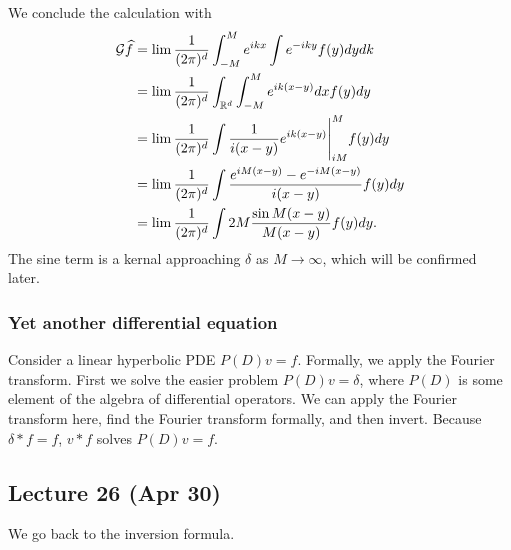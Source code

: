 \documentclass[10pt, twoside]{article}
\begin{document}
    We conclude the calculation with 
    \begin{align*}
        \mathcal{G} \widehat{f} &= \lim \frac{1}{(2\pi)^d} \int_{-M}^M e^{ikx} \int e^{-iky} f(y) dy dk \\
                           &= \lim \frac{1}{(2\pi)^d} \int_{\mathbb{R}^d} \int_{-M}^M e^{ik(x-y)} dx f(y) dy \\
                           &= \lim \frac{1}{(2\pi)^d} \int \frac{1}{i(x-y)}e^{ik(x-y)} \Biggl\lvert_{iM}^M f(y) dy \\
                           &= \lim \frac{1}{(2\pi)^d} \int \frac{e^{iM(x-y)} - e^{-iM(x-y)}}{i(x-y)} f(y) dy \\
                           &= \lim \frac{1}{(2\pi)^d} \int 2M \frac{\sin M(x-y)}{M(x-y)} f(y) dy.
    \end{align*}
    The sine term is a kernal approaching $\delta$ as $M \to \infty$, which will be confirmed later.

    \subsubsection{Yet another differential equation}
    Consider a linear hyperbolic PDE $P(D)v = f$. Formally, we apply the Fourier transform. First we solve the easier problem $P(D)v = \delta$, where $P(D)$ is some element of the algebra of differential operators. We can apply the Fourier transform here, find the Fourier transform formally, and then invert. Because $\delta*f = f$, $v*f$ solves $P(D)v = f$.
    
    \subsection{Lecture 26 (Apr 30)}
    We go back to the inversion formula.
\end{document}

